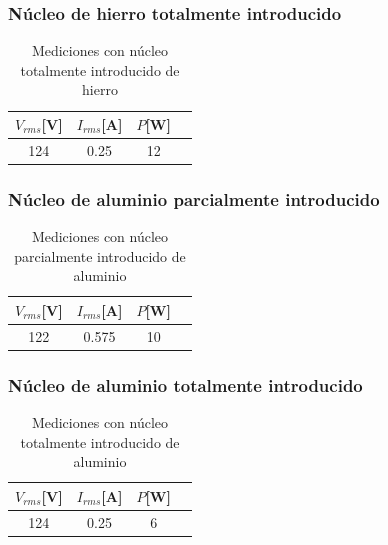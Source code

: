 \documentclass{article}
\begin{document}
            \subsubsection{Núcleo de hierro totalmente introducido}

            \begin{table}[H]
                \centering
                \begin{tabular}{|c|c|c|c|}
                    \hline
                    $V_{rms} $[V] & $I_{rms} $[A] & $P $[W] \\ \hline
                    124           & 0.25         & 12    \\ \hline
                \end{tabular}
                \caption{Mediciones con núcleo totalmente introducido de hierro}
                \label{tab:mediciones-nucleo-totalmente-introducido-hierro}
            \end{table}

            \subsubsection{Núcleo de aluminio parcialmente introducido}

            \begin{table}[H]
                \centering
                \begin{tabular}{|c|c|c|c|}
                    \hline
                    $V_{rms} $[V] & $I_{rms} $[A] & $P $[W] \\ \hline
                    122           & 0.575         & 10    \\ \hline
                \end{tabular}
                \caption{Mediciones con núcleo parcialmente introducido de aluminio}
                \label{tab:mediciones-nucleo-parcialmente-introducido-aluminio}
            \end{table}

            \subsubsection{Núcleo de aluminio totalmente introducido}

            \begin{table}[H]
                \centering
                \begin{tabular}{|c|c|c|c|}
                    \hline
                    $V_{rms} $[V] & $I_{rms} $[A] & $P $[W] \\ \hline
                    124           & 0.25         & 6    \\ \hline
                \end{tabular}
                \caption{Mediciones con núcleo totalmente introducido de aluminio}
                \label{tab:mediciones-nucleo-totalmente-introducido-aluminio}
            \end{table}
\end{document}
